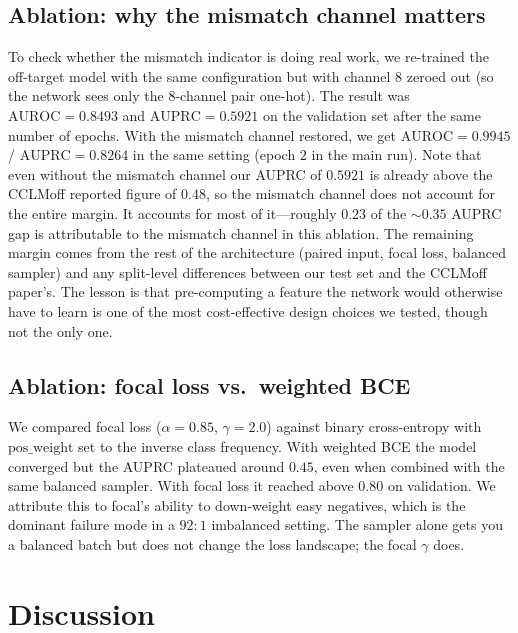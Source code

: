 \documentclass[11pt,a4paper]{article}
\begin{document}
\subsection{Ablation: why the mismatch channel matters}

To check whether the mismatch indicator is doing real work, we re-trained the off-target model with the same configuration but with channel $8$ zeroed out (so the network sees only the $8$-channel pair one-hot). The result was $\mathrm{AUROC}=0.8493$ and $\mathrm{AUPRC}=0.5921$ on the validation set after the same number of epochs. With the mismatch channel restored, we get $\mathrm{AUROC}=0.9945$ / $\mathrm{AUPRC}=0.8264$ in the same setting (epoch $2$ in the main run). Note that even without the mismatch channel our AUPRC of $0.5921$ is already above the CCLMoff reported figure of $0.48$, so the mismatch channel does not account for the entire margin. It accounts for most of it---roughly $0.23$ of the $\sim 0.35$ AUPRC gap is attributable to the mismatch channel in this ablation. The remaining margin comes from the rest of the architecture (paired input, focal loss, balanced sampler) and any split-level differences between our test set and the CCLMoff paper's. The lesson is that pre-computing a feature the network would otherwise have to learn is one of the most cost-effective design choices we tested, though not the only one.

\subsection{Ablation: focal loss vs.\ weighted BCE}

We compared focal loss ($\alpha{=}0.85$, $\gamma{=}2.0$) against binary cross-entropy with $\text{pos\_weight}$ set to the inverse class frequency. With weighted BCE the model converged but the AUPRC plateaued around $0.45$, even when combined with the same balanced sampler. With focal loss it reached above $0.80$ on validation. We attribute this to focal's ability to down-weight easy negatives, which is the dominant failure mode in a $92{:}1$ imbalanced setting. The sampler alone gets you a balanced batch but does not change the loss landscape; the focal $\gamma$ does.

\section{Discussion}
\label{sec:discussion}
\end{document}
